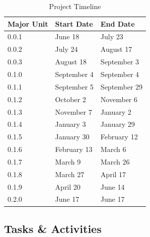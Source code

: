 \documentclass[11pt]{article}
\begin{document}
      \begin{table}[H]
        \centering
        \begin{tabular}{l p{4cm} p{4cm}}
          \toprule
          Major Unit & Start Date & End Date \\ [0.5ex]
          \midrule
          0.0.1 & June 18 & July 23 \\
          0.0.2 & July 24 & August 17 \\
          0.0.3 & August 18 & September 3 \\
          0.1.0 & September 4 & September 4 \\
          0.1.1 & September 5 & September 29 \\
          0.1.2 & October 2 & November 6 \\
          0.1.3 & November 7 & January 2 \\
          0.1.4 & January 3 & January 29 \\
          0.1.5 & January 30 & February 12 \\
          0.1.6 & February 13 & March 6 \\
          0.1.7 & March 9 & March 26 \\
          0.1.8 & March 27 & April 17 \\
          0.1.9 & April 20 & June 14 \\
          0.2.0 & June 17 & June 17 \\
          \bottomrule
        \end{tabular}
        \caption{Project Timeline}\label{tab:timeline}
      \end{table}

    \subsection{Tasks \& Activities}\label{sec:plan-tasks}
\end{document}
